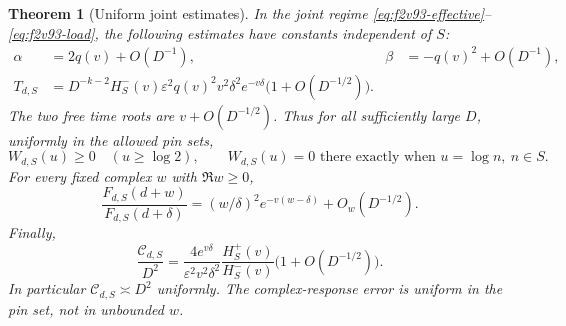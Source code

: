 \documentclass[11pt]{article}
\newtheorem{theorem}{Theorem}[section]
\theoremstyle{definition}
\theoremstyle{remark}
\begin{document}
\begin{theorem}[Uniform joint estimates]
\label{thm:f2v93-joint}
In the joint regime \eqref{eq:f2v93-effective}--\eqref{eq:f2v93-load},
the following estimates have constants independent of \(S\):
\begin{align}
 \alpha&=2q(v)+O(D^{-1}),&
 \beta&=-q(v)^2+O(D^{-1}),
 \label{eq:f2v93-coefficients}\\
 T_{d,S}&=D^{-k-2}H_S^-(v)\varepsilon^2q(v)^2
       v^2\delta^2e^{-v\delta}\bigl(1+O(D^{-1/2})\bigr).
 \label{eq:f2v93-target}
\end{align}
The two free time roots are \(v+O(D^{-1/2})\).  Thus for all
sufficiently large \(D\), uniformly in the allowed pin sets,
\begin{equation}
 W_{d,S}(u)\ge0\quad(u\ge\log2),
 \qquad W_{d,S}(u)=0\text{ there exactly when }u=\log n,\ n\in S.
 \label{eq:f2v93-admissibility}
\end{equation}
For every fixed complex \(w\) with \(\Re w\ge0\),
\begin{equation}
 \frac{F_{d,S}(d+w)}{F_{d,S}(d+\delta)}
 =(w/\delta)^2e^{-v(w-\delta)}+O_w(D^{-1/2}).
 \label{eq:f2v93-response}
\end{equation}
Finally,
\begin{equation}
 \frac{\mathcal C_{d,S}}{D^2}
 =\frac{4e^{v\delta}}{\varepsilon^2v^2\delta^2}
       \frac{H_S^+(v)}{H_S^-(v)}
          \bigl(1+O(D^{-1/2})\bigr).
 \label{eq:f2v93-cost}
\end{equation}
In particular \(\mathcal C_{d,S}\asymp D^2\) uniformly.
The complex-response error is uniform in the pin set, not in unbounded
\(w\).
\end{theorem}
\end{document}
